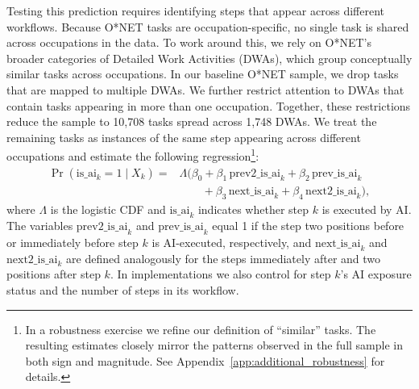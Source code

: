 Testing this prediction requires identifying steps that appear across different workflows.
Because O*NET tasks are occupation-specific, no single task is shared across occupations in the data.
To work around this, we rely on O*NET's broader categories of Detailed Work Activities (DWAs), which group conceptually similar tasks across occupations.
In our baseline O*NET sample, we drop tasks that are mapped to multiple DWAs.
We further restrict attention to DWAs that contain tasks appearing in more than one occupation.
Together, these restrictions reduce the sample to 10{,}708 tasks spread across 1{,}748 DWAs.
We treat the remaining tasks as instances of the same step appearing across different occupations and estimate the following regression\footnote{In a robustness exercise we refine our definition of ``similar'' tasks.
The resulting estimates closely mirror the patterns observed in the full sample in both sign and magnitude.
See Appendix~\ref{app:additional_robustness} for details.}:
\begin{equation}
\begin{aligned}
    \Pr\!\left( \text{is\_ai}_{k} = 1 \mid X_k \right)
    ={}
    &\Lambda\!\Big(
        \beta_0
        + \beta_1 \, \text{prev2\_is\_ai}_{k}
        + \beta_2 \, \text{prev\_is\_ai}_{k} \\
    &\qquad
        + \beta_3 \, \text{next\_is\_ai}_{k}
        + \beta_4 \, \text{next2\_is\_ai}_{k}
    \Big),
\end{aligned}
    \label{eq:DWA_regression_ai}
\end{equation}
where $\Lambda$ is the logistic CDF and \emph{$\text{is\_ai}_{k}$} indicates whether step $k$ is executed by AI.
The variables \emph{$\text{prev2\_is\_ai}_{k}$} and \emph{$\text{prev\_is\_ai}_{k}$} equal 1 if the step two positions before or immediately before step $k$ is AI-executed, respectively, and \emph{$\text{next\_is\_ai}_{k}$} and \emph{$\text{next2\_is\_ai}_{k}$} are defined analogously for the steps immediately after and two positions after step $k$.
In implementations we also control for step $k$'s AI exposure status and the number of steps in its workflow.

